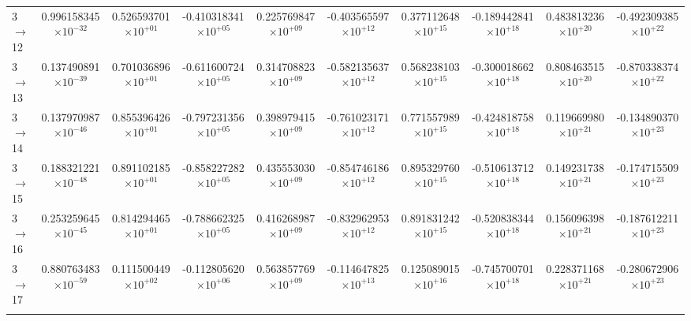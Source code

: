\documentclass[reviewcopy]{elsarticle}
\begin{document}
\begin{landscape}
\begin{longtable}{lccccccccc}
3 $\to$ 12  & 0.996158345$\times10^{-32}$  & 0.526593701$\times10^{+01}$  & -0.410318341$\times10^{+05}$  & 0.225769847$\times10^{+09}$  & -0.403565597$\times10^{+12}$  & 0.377112648$\times10^{+15}$  & -0.189442841$\times10^{+18}$  & 0.483813236$\times10^{+20}$  & -0.492309385$\times10^{+22}$ \\
3 $\to$ 13  & 0.137490891$\times10^{-39}$  & 0.701036896$\times10^{+01}$  & -0.611600724$\times10^{+05}$  & 0.314708823$\times10^{+09}$  & -0.582135637$\times10^{+12}$  & 0.568238103$\times10^{+15}$  & -0.300018662$\times10^{+18}$  & 0.808463515$\times10^{+20}$  & -0.870338374$\times10^{+22}$ \\
3 $\to$ 14  & 0.137970987$\times10^{-46}$  & 0.855396426$\times10^{+01}$  & -0.797231356$\times10^{+05}$  & 0.398979415$\times10^{+09}$  & -0.761023171$\times10^{+12}$  & 0.771557989$\times10^{+15}$  & -0.424818758$\times10^{+18}$  & 0.119669980$\times10^{+21}$  & -0.134890370$\times10^{+23}$ \\
3 $\to$ 15  & 0.188321221$\times10^{-48}$  & 0.891102185$\times10^{+01}$  & -0.858227282$\times10^{+05}$  & 0.435553030$\times10^{+09}$  & -0.854746186$\times10^{+12}$  & 0.895329760$\times10^{+15}$  & -0.510613712$\times10^{+18}$  & 0.149231738$\times10^{+21}$  & -0.174715509$\times10^{+23}$ \\
3 $\to$ 16  & 0.253259645$\times10^{-45}$  & 0.814294465$\times10^{+01}$  & -0.788662325$\times10^{+05}$  & 0.416268987$\times10^{+09}$  & -0.832962953$\times10^{+12}$  & 0.891831242$\times10^{+15}$  & -0.520838344$\times10^{+18}$  & 0.156096398$\times10^{+21}$  & -0.187612211$\times10^{+23}$ \\
3 $\to$ 17  & 0.880763483$\times10^{-59}$  & 0.111500449$\times10^{+02}$  & -0.112805620$\times10^{+06}$  & 0.563857769$\times10^{+09}$  & -0.114647825$\times10^{+13}$  & 0.125089015$\times10^{+16}$  & -0.745700701$\times10^{+18}$  & 0.228371168$\times10^{+21}$  & -0.280672906$\times10^{+23}$ \\[3pt]
\hline \\
\end{longtable}
\normalsize
\renewcommand{\thefootnote}{\arabic{footnote}}
\renewcommand{\arraystretch}{1.0}
\end{landscape}

\newpage
\end{document}
